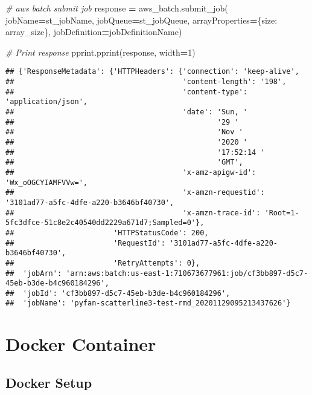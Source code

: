 \documentclass[
]{book}
\newenvironment{Shaded}{\begin{snugshade}}{\end{snugshade}}
\newcommand{\CommentTok}[1]{\textcolor[rgb]{0.56,0.35,0.01}{\textit{#1}}}
\newcommand{\DecValTok}[1]{\textcolor[rgb]{0.00,0.00,0.81}{#1}}
\newcommand{\NormalTok}[1]{#1}
\newcommand{\OperatorTok}[1]{\textcolor[rgb]{0.81,0.36,0.00}{\textbf{#1}}}
\newcommand{\StringTok}[1]{\textcolor[rgb]{0.31,0.60,0.02}{#1}}
\begin{document}
\begin{Shaded}
\begin{Highlighting}[]
\CommentTok{\# aws batch submit job}
\NormalTok{response }\OperatorTok{=}\NormalTok{ aws\_batch.submit\_job(}
\NormalTok{    jobName}\OperatorTok{=}\NormalTok{st\_jobName,}
\NormalTok{    jobQueue}\OperatorTok{=}\NormalTok{st\_jobQueue,}
\NormalTok{    arrayProperties}\OperatorTok{=}\NormalTok{\{}\StringTok{\textquotesingle{}size\textquotesingle{}}\NormalTok{: array\_size\},}
\NormalTok{    jobDefinition}\OperatorTok{=}\NormalTok{jobDefinitionName)}
    
\CommentTok{\# Print response}
\NormalTok{pprint.pprint(response, width}\OperatorTok{=}\DecValTok{1}\NormalTok{)}
\end{Highlighting}
\end{Shaded}

\begin{verbatim}
## {'ResponseMetadata': {'HTTPHeaders': {'connection': 'keep-alive',
##                                       'content-length': '198',
##                                       'content-type': 'application/json',
##                                       'date': 'Sun, '
##                                               '29 '
##                                               'Nov '
##                                               '2020 '
##                                               '17:52:14 '
##                                               'GMT',
##                                       'x-amz-apigw-id': 'Wx_oOGCYIAMFVVw=',
##                                       'x-amzn-requestid': '3101ad77-a5fc-4dfe-a220-b3646bf40730',
##                                       'x-amzn-trace-id': 'Root=1-5fc3dfce-51c8e2c40540dd2229a671d7;Sampled=0'},
##                       'HTTPStatusCode': 200,
##                       'RequestId': '3101ad77-a5fc-4dfe-a220-b3646bf40730',
##                       'RetryAttempts': 0},
##  'jobArn': 'arn:aws:batch:us-east-1:710673677961:job/cf3bb897-d5c7-45eb-b3de-b4c960184296',
##  'jobId': 'cf3bb897-d5c7-45eb-b3de-b4c960184296',
##  'jobName': 'pyfan-scatterline3-test-rmd_20201129095213437626'}
\end{verbatim}

\hypertarget{docker-container}{%
\chapter{Docker Container}\label{docker-container}}

\hypertarget{docker-setup}{%
\section{Docker Setup}\label{docker-setup}}
\end{document}
